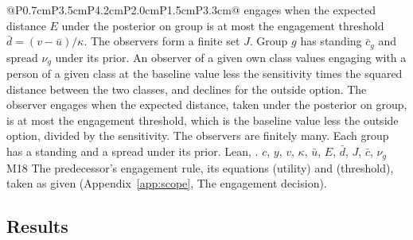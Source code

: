 \begin{longtable}{@{}P{0.7cm}P{3.5cm}P{4.2cm}P{2.0cm}P{1.5cm}P{3.3cm}@{}}
{  engages when the expected distance $E$ under the posterior on group is at
  most the engagement threshold $\bar d=(v-\bar u)/\kappa$. The observers
  form a finite set $J$. Group $g$ has standing $\bar c_g$ and spread
  $\nu_g$ under its prior.}
  {An observer of a given own class values engaging with a person of a given
  class at the baseline value less the sensitivity times the squared
  distance between the two classes, and declines for the outside option. The
  observer engages when the expected distance, taken under the posterior on
  group, is at most the engagement threshold, which is the baseline value
  less the outside option, divided by the sensitivity. The observers are
  finitely many. Each group has a standing and a spread under its prior.
  Lean, .}
  {$c$, $y$, $v$, $\kappa$, $\bar u$, $E$, $\bar d$, $J$, $\bar c$, $\nu_g$}
  {M18}
  {The predecessor's engagement rule, its equations (utility) and
  (threshold), taken as given (Appendix~\ref{app:scope}, The engagement
  decision).}
\end{longtable}
\normalsize

\subsection{Results}

